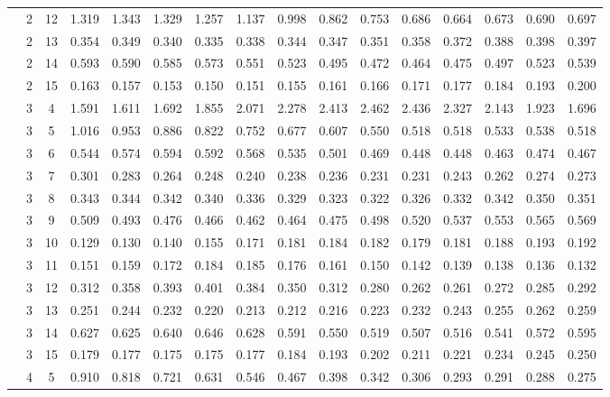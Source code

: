 \documentclass[useAMS,usenatbib]{mn2e}
\begin{document}
\begin{longtable}{cccccccccccccccc}
 &  2 & 12 & 1.319 & 1.343 & 1.329 & 1.257 & 1.137 & 0.998 & 0.862 & 0.753 & 0.686 & 0.664 & 0.673 & 0.690 & 0.697 \\
 &  2 & 13 & 0.354 & 0.349 & 0.340 & 0.335 & 0.338 & 0.344 & 0.347 & 0.351 & 0.358 & 0.372 & 0.388 & 0.398 & 0.397 \\
 &  2 & 14 & 0.593 & 0.590 & 0.585 & 0.573 & 0.551 & 0.523 & 0.495 & 0.472 & 0.464 & 0.475 & 0.497 & 0.523 & 0.539 \\
 &  2 & 15 & 0.163 & 0.157 & 0.153 & 0.150 & 0.151 & 0.155 & 0.161 & 0.166 & 0.171 & 0.177 & 0.184 & 0.193 & 0.200 \\
 &  3 &  4 & 1.591 & 1.611 & 1.692 & 1.855 & 2.071 & 2.278 & 2.413 & 2.462 & 2.436 & 2.327 & 2.143 & 1.923 & 1.696 \\
 &  3 &  5 & 1.016 & 0.953 & 0.886 & 0.822 & 0.752 & 0.677 & 0.607 & 0.550 & 0.518 & 0.518 & 0.533 & 0.538 & 0.518 \\
 &  3 &  6 & 0.544 & 0.574 & 0.594 & 0.592 & 0.568 & 0.535 & 0.501 & 0.469 & 0.448 & 0.448 & 0.463 & 0.474 & 0.467 \\
 &  3 &  7 & 0.301 & 0.283 & 0.264 & 0.248 & 0.240 & 0.238 & 0.236 & 0.231 & 0.231 & 0.243 & 0.262 & 0.274 & 0.273 \\
 &  3 &  8 & 0.343 & 0.344 & 0.342 & 0.340 & 0.336 & 0.329 & 0.323 & 0.322 & 0.326 & 0.332 & 0.342 & 0.350 & 0.351 \\
 &  3 &  9 & 0.509 & 0.493 & 0.476 & 0.466 & 0.462 & 0.464 & 0.475 & 0.498 & 0.520 & 0.537 & 0.553 & 0.565 & 0.569 \\
 &  3 & 10 & 0.129 & 0.130 & 0.140 & 0.155 & 0.171 & 0.181 & 0.184 & 0.182 & 0.179 & 0.181 & 0.188 & 0.193 & 0.192 \\
 &  3 & 11 & 0.151 & 0.159 & 0.172 & 0.184 & 0.185 & 0.176 & 0.161 & 0.150 & 0.142 & 0.139 & 0.138 & 0.136 & 0.132 \\
 &  3 & 12 & 0.312 & 0.358 & 0.393 & 0.401 & 0.384 & 0.350 & 0.312 & 0.280 & 0.262 & 0.261 & 0.272 & 0.285 & 0.292 \\
 &  3 & 13 & 0.251 & 0.244 & 0.232 & 0.220 & 0.213 & 0.212 & 0.216 & 0.223 & 0.232 & 0.243 & 0.255 & 0.262 & 0.259 \\
 &  3 & 14 & 0.627 & 0.625 & 0.640 & 0.646 & 0.628 & 0.591 & 0.550 & 0.519 & 0.507 & 0.516 & 0.541 & 0.572 & 0.595 \\
 &  3 & 15 & 0.179 & 0.177 & 0.175 & 0.175 & 0.177 & 0.184 & 0.193 & 0.202 & 0.211 & 0.221 & 0.234 & 0.245 & 0.250 \\
 &  4 &  5 & 0.910 & 0.818 & 0.721 & 0.631 & 0.546 & 0.467 & 0.398 & 0.342 & 0.306 & 0.293 & 0.291 & 0.288 & 0.275 \\

\end{longtable}
\end{document}

